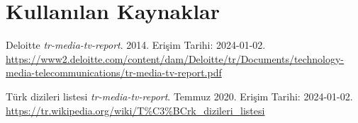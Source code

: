 \section{Kullanılan Kaynaklar}

\begingroup
\raggedright
\begin{thebibliography}{}

Deloitte \textit{tr-media-tv-report}. 2014. Erişim Tarihi: 2024-01-02. \\
\url{https://www2.deloitte.com/content/dam/Deloitte/tr/Documents/technology-media-telecommunications/tr-media-tv-report.pdf}

Türk dizileri listesi \textit{tr-media-tv-report}. Temmuz 2020. Erişim Tarihi: 2024-01-02. \\
\url{https://tr.wikipedia.org/wiki/T%C3%BCrk_dizileri_listesi}

\end{thebibliography}
\endgroup
